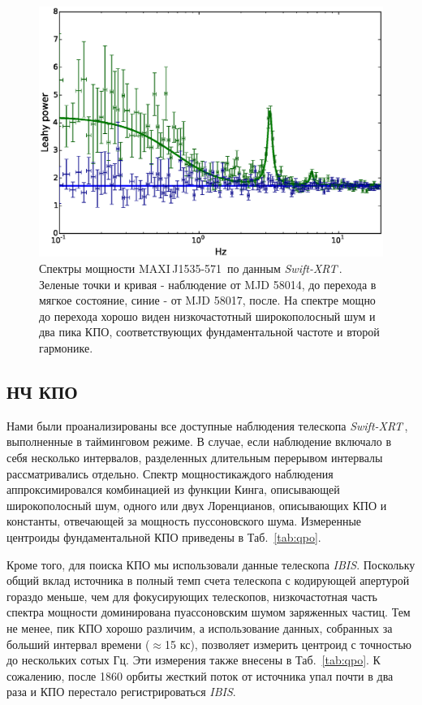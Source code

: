 \documentclass{pazhb}
\def\maxisrc{MAXI\,J1535-571}
\def\swiftx{{\em Swift-XRT\,}}
\def\ibis{ {\em IBIS}}
\begin{document}
\begin{figure}
\centerline{\includegraphics[width=\linewidth]{transition_v01.eps}}
\caption{Спектры мощности \maxisrc\, по данным \swiftx. Зеленые точки и кривая - наблюдение от MJD 58014, до перехода в мягкое состояние, синие - от MJD 58017, после. На спектре мощно до перехода хорошо виден низкочастотный широкополосный шум и два пика КПО, соответствующих фундаментальной частоте и второй гармонике.}
\label{fig:powtrans}
\end{figure}

\subsection{НЧ КПО}
Нами были проанализированы все доступные наблюдения телескопа \swiftx, выполненные в тайминговом режиме. В случае, если наблюдение включало в себя несколько интервалов, разделенных длительным перерывом интервалы рассматривались отдельно. Спектр мощностикаждого наблюдения аппроксимировался комбинацией из функции Кинга, описывающей широкополосный шум, одного или двух Лоренцианов, описывающих КПО и константы, отвечающей за мощность пуссоновского шума. Измеренные центроиды фундаментальной КПО приведены в Таб.~\ref{tab:qpo}. 

Кроме того, для поиска КПО мы использовали данные телескопа \ibis. Поскольку общий вклад источника в полный темп счета телескопа с кодирующей апертурой гораздо меньше, чем для фокусирующих телескопов, низкочастотная часть спектра мощности доминирована пуассоновским шумом заряженных частиц. Тем не менее, пик КПО хорошо различим, а использование данных, собранных за больший интервал времени ($\approx$15 кс), позволяет измерить центроид с точностью до нескольких сотых Гц. Эти измерения также внесены в Таб.~\ref{tab:qpo}. К сожалению, после 1860 орбиты жесткий поток от источника упал почти в два раза и КПО перестало регистрироваться \ibis.
\end{document}
